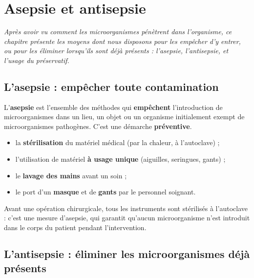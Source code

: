 \chapter{Asepsie et antisepsie}

\noindent\textit{Après avoir vu comment les microorganismes pénètrent dans
l'organisme, ce chapitre présente les moyens dont nous disposons pour les empêcher
d'y entrer, ou pour les éliminer lorsqu'ils sont déjà présents : l'asepsie,
l'antisepsie, et l'usage du préservatif.}
\vspace{8pt}

\connecteBanner

\section{L'asepsie : empêcher toute contamination}

\begin{definition}[Asepsie]
L'\textbf{asepsie} est l'ensemble des méthodes qui \textbf{empêchent} l'introduction
de microorganismes dans un lieu, un objet ou un organisme initialement exempt de
microorganismes pathogènes. C'est une démarche \textbf{préventive}.
\end{definition}

\begin{propriete}
\begin{itemize}
\item la \textbf{stérilisation} du matériel médical (par la chaleur, à l'autoclave) ;
\item l'utilisation de matériel \textbf{à usage unique} (aiguilles, seringues,
gants) ;
\item le \textbf{lavage des mains} avant un soin ;
\item le port d'un \textbf{masque} et de \textbf{gants} par le personnel soignant.
\end{itemize}
\end{propriete}

\begin{exemple}
Avant une opération chirurgicale, tous les instruments sont stérilisés à l'autoclave :
c'est une mesure d'asepsie, qui garantit qu'aucun microorganisme n'est introduit dans
le corps du patient pendant l'intervention.
\end{exemple}

\section{L'antisepsie : éliminer les microorganismes déjà présents}

